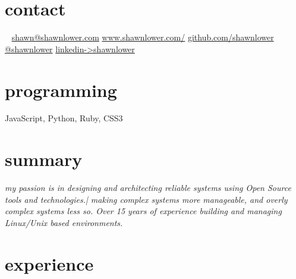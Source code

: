 \documentclass[]{shawnlower-cv}
\begin{document}
%
%


\begin{aside}
  \section{contact}
  ~
    \iconMail\href{mailto:shawn@shawnlower.com}{ shawn@shawnlower.com}
    \iconHome\href{http://www.shawnlower.com/}{ www.shawnlower.com/}
    \iconGithub\href{https://github.com/shawnlower}{ github.com/shawnlower}
    \iconTwitter\href{https://www.twitter.com/shawnlower}{ @shawnlower}
    \iconLinkedIn\href{https://www.linkedin.com/in/shawnlower}{ linkedin->shawnlower}
  \section{programming}
    JavaScript, Python, Ruby, CSS3
\end{aside}


\section{summary}

\emph{%
my passion is in designing and architecting reliable systems using Open Source tools and technologies.| making complex systems more manageable, and overly complex systems less so. Over 15 years of experience building and managing Linux/Unix based environments.
}

\section{experience}
\end{document}
